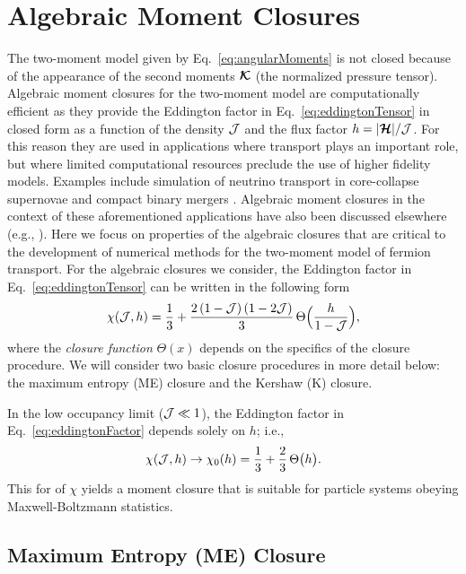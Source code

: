 \section{Algebraic Moment Closures}
\label{sec:algebraicClosure}

The two-moment model given by Eq.~\eqref{eq:angularMoments} is not closed because of the appearance of the second moments $\boldsymbol{\mathcal{K}}$ (the normalized pressure tensor).  
Algebraic moment closures for the two-moment model are computationally efficient as they provide the Eddington factor in Eq.~\eqref{eq:eddingtonTensor} in closed form as a function of the density $\mathcal{J}$ and the flux factor $h=|\boldsymbol{\mathcal{H}}|/\mathcal{J}$.  
For this reason they are used in applications where transport plays an important role, but where limited computational resources preclude the use of higher fidelity models.  
Examples include simulation of neutrino transport in core-collapse supernovae \cite{roberts_etal_2016} and compact binary mergers \cite{foucart_etal_2015}.  
Algebraic moment closures in the context of these aforementioned applications have also been discussed elsewhere (e.g., \cite{janka_etal_1992,pons_etal_2000,smit_etal_2000,just_etal_2015,murchikova_etal_2017}).  
Here we focus on properties of the algebraic closures that are critical to the development of numerical methods for the two-moment model of fermion transport.  
For the algebraic closures we consider, the Eddington factor in Eq.~\eqref{eq:eddingtonTensor} can be written in the following form \cite{cernohorskyBludman_1994}
\begin{equation}
  \chi(\mathcal{J},h)=\frac{1}{3}+\frac{2\,(1-\mathcal{J})\,(1-2\mathcal{J})}{3}\,\Theta\Big(\frac{h}{1-\mathcal{J}}\Big),
  \label{eq:eddingtonFactor}
\end{equation}
where the \emph{closure function} $\Theta(x)$ depends on the specifics of the closure procedure.  
We will consider two basic closure procedures in more detail below: the maximum entropy (ME) closure and the Kershaw (K) closure.  

In the low occupancy limit ($\mathcal{J}\ll1$), the Eddington factor in Eq.~\eqref{eq:eddingtonFactor} depends solely on $h$; i.e.,
\begin{equation}
  \chi(\mathcal{J},h)\to\chi_{0}(h)=\frac{1}{3}+\frac{2}{3}\,\Theta\big(h\big).  
  \label{eq:eddingtonFactorLow}
\end{equation}
This for of $\chi$ yields a moment closure that is suitable for particle systems obeying Maxwell-Boltzmann statistics.  

\subsection{Maximum Entropy (ME) Closure}


